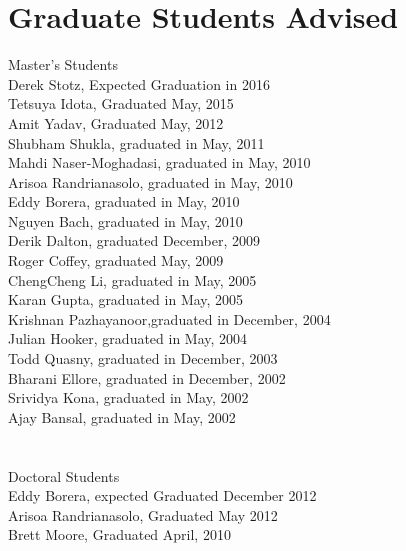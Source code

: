 \documentclass[12pt]{resume}
\begin{document}
\section{Graduate Students Advised}{Master's Students}
{\\Derek Stotz, Expected Graduation in 2016\\
  Tetsuya Idota, Graduated May, 2015\\
  Amit Yadav, Graduated May, 2012\\
  Shubham Shukla, graduated in May, 2011\\
  Mahdi Naser-Moghadasi, graduated in May, 2010\\
  Arisoa Randrianasolo, graduated in May, 2010\\
  Eddy Borera, graduated in  May, 2010\\
  Nguyen Bach, graduated in  May, 2010\\
  Derik Dalton, graduated December, 2009\\
  Roger Coffey, graduated May, 2009\\
  ChengCheng Li, graduated in May, 2005\\
  Karan Gupta, graduated in May, 2005\\
  Krishnan Pazhayanoor,graduated in December, 2004\\
  Julian Hooker, graduated in May, 2004\\
  Todd Quasny, graduated in December, 2003\\
  Bharani Ellore, graduated in December, 2002\\
  Srividya Kona, graduated in May, 2002\\
  Ajay Bansal, graduated in May, 2002\\
}

\section{}{Doctoral Students}
{
  \\Eddy Borera, expected Graduated December 2012\\
  Arisoa Randrianasolo, Graduated May 2012\\
  Brett Moore, Graduated April, 2010\\
 }

\end{document}
